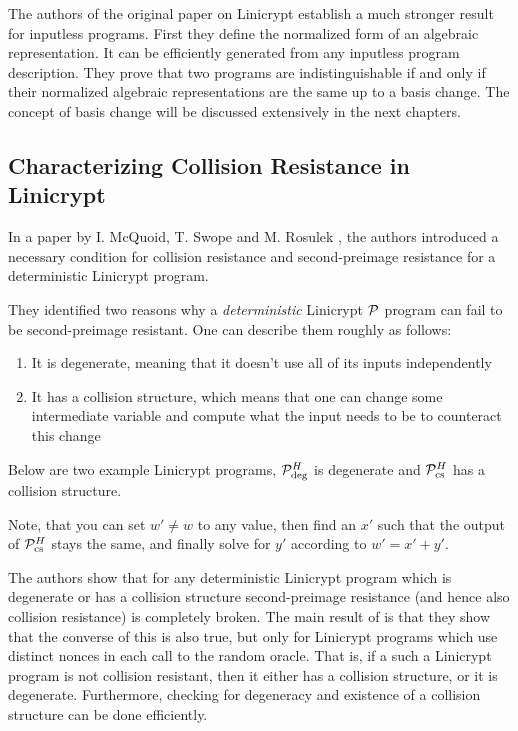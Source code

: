 The authors of the original paper on Linicrypt \cite{C:CarRos16} establish a much stronger result for inputless programs.
First they define the normalized form of an algebraic representation.
It can be efficiently generated from any inputless program description.
They prove that two programs are indistinguishable if and only if their normalized algebraic representations are the same up to a basis change.
The concept of basis change will be discussed extensively in the next chapters.

\subsection{Characterizing Collision Resistance in Linicrypt}

In a paper by I. McQuoid, T. Swope and M. Rosulek
\cite[Characterizing Collision and Second-Preimage Resistance in Linicrypt]{TCC:McQSwoRos19},
the authors introduced a necessary condition for collision resistance
and second-preimage resistance for a deterministic Linicrypt program.

They identified two reasons why a \textit{deterministic} Linicrypt $\P$ program can fail to be second-preimage resistant.
One can describe them roughly as follows:
\begin{enumerate}
  \item It is degenerate, meaning that it doesn't use all of its inputs independently
  \item It has a collision structure,
    which means that one can change some intermediate variable and compute what the input needs to be to counteract this change
\end{enumerate}

Below are two example Linicrypt programs, $\P^\H_\textrm{deg}$ is degenerate and $\P^\H_\textrm{cs}$ has a collision structure.
\begin{pchstack}[center,space=2cm]
\end{pchstack}
Note, that you can set $w' \neq w$ to any value,
then find an $x'$ such that the output of $\P^\H_{\textrm{cs}}$ stays the same,
and finally solve for $y'$ according to $w' = x' + y'$.

The authors show that for any deterministic Linicrypt program which is degenerate
or has a collision structure
second-preimage resistance (and hence also collision resistance) is completely broken.
The main result of \cite{C:CarRos16} is that they show that the converse of this is also true,
but only for Linicrypt programs which use distinct nonces in each call to the random oracle.
That is, if a such a Linicrypt program is not collision resistant,
then it either has a collision structure, or it is degenerate.
Furthermore, checking for degeneracy and existence of a collision structure can be done efficiently.

